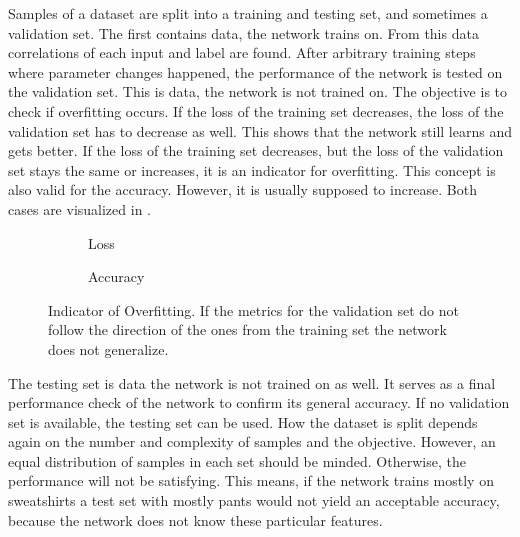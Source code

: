 Samples of a dataset are split into a training and testing set, and sometimes a validation set\cite{James2014}.
The first contains data, the network trains on.
From this data correlations of each input and label are found.
After arbitrary training steps where parameter changes happened, the performance of the network is tested on the validation set.
This is data, the network is not trained on.
The objective is to check if overfitting occurs.
If the loss of the training set decreases, the loss of the validation set has to decrease as well.
This shows that the network still learns and gets better.
If the loss of the training set decreases, but the loss of the validation set stays the same or increases, it is an indicator for overfitting.
This concept is also valid for the accuracy.
However, it is usually supposed to increase.
Both cases are visualized in .
\begin{figure}
	\setlength{}
	\setlength{}
	\centering
	\begin{subfigure}{.5\textwidth}
		
		\caption[Loss]{Loss}
	\end{subfigure}%
	\begin{subfigure}{.5\textwidth}
		
		\caption[Accuracy]{Accuracy}
	\end{subfigure}
	\caption[Indicator of Overfitting]{Indicator of Overfitting. If the metrics for the validation set do not follow the direction of the ones from the training set the network does not generalize.}
	\label{fig:overfitting}
\end{figure}

The testing set is data the network is not trained on as well.
It serves as a final performance check of the network to confirm its general accuracy.
If no validation set is available, the testing set can be used.
How the dataset is split depends again on the number and complexity of samples and the objective.
However, an equal distribution of samples in each set should be minded.
Otherwise, the performance will not be satisfying.
This means, if the network trains mostly on sweatshirts a test set with mostly pants would not yield an acceptable accuracy, because the network does not know these particular features.

